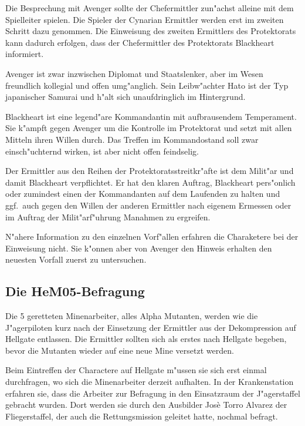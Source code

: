 \begin{remarks}
Die Besprechung mit Avenger sollte der Chefermittler zun"achst alleine mit dem Spielleiter spielen. Die Spieler der Cynarian Ermittler werden erst im zweiten Schritt dazu genommen. Die Einweisung des zweiten Ermittlers des Protektorats kann dadurch erfolgen, dass der Chefermittler des Protektorats Blackheart informiert.

Avenger ist zwar inzwischen Diplomat und Staatslenker, aber im Wesen freundlich kollegial und offen umg"anglich. Sein Leibw"achter Hato ist der Typ japanischer Samurai und h"alt sich unaufdringlich im Hintergrund.

Blackheart ist eine legend"are Kommandantin mit aufbrausendem Temperament. Sie k"ampft gegen Avenger um die Kontrolle im Protektorat und setzt mit allen Mitteln ihren Willen durch. Das Treffen im Kommandostand soll zwar einsch"uchternd wirken, ist aber nicht offen feindselig.

Der Ermittler aus den Reihen der Protektoratsstreitkr"afte ist dem Milit"ar und damit Blackheart verpflichtet. Er hat den klaren Auftrag, Blackheart pers"onlich oder zumindest einen der Kommandanten auf dem Laufenden zu halten und ggf.~auch gegen den Willen der anderen Ermittler nach eigenem Ermessen oder im Auftrag der Milit"arf"uhrung Ma\3nahmen zu ergreifen.

N"ahere Information zu den einzelnen Vorf"allen erfahren die Charaketere bei der Einweisung nicht. Sie k"onnen aber von Avenger den Hinweis erhalten den neuesten Vorfall zuerst zu untersuchen.
\end{remarks}

\subsection{Die HeM05-Befragung}

Die 5 geretteten Minenarbeiter, alles Alpha Mutanten, werden wie die J"agerpiloten kurz nach der Einsetzung der Ermittler aus der Dekompression auf Hellgate entlassen. Die Ermittler sollten sich als erstes nach Hellgate begeben, bevor die Mutanten wieder auf eine neue Mine versetzt werden.

Beim Eintreffen der Charactere auf Hellgate m"ussen sie sich erst einmal durchfragen, wo sich die Minenarbeiter derzeit aufhalten. In der Krankenstation erfahren sie, dass die Arbeiter zur Befragung in den Einsatzraum der J"agerstaffel gebracht wurden. Dort werden sie durch den Ausbilder Jos\`{e} \frqq{}Torro\flqq{} Alvarez der Fliegerstaffel, der auch die Rettungsmission geleitet hatte, nochmal befragt.

